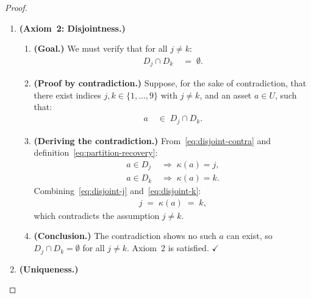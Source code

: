 \documentclass[12pt,openany]{book}
\newcommand{\calU}{\mathcal{U}}
\newcommand{\calD}{\mathcal{D}}
\numberwithin{equation}{chapter}
\theoremstyle{plain}
\theoremstyle{definition}
\theoremstyle{remark}
\def\calU{U}%
\def\calD{D}%
\def\mathcal#1{#1}%
\begin{document}
\begin{proof}
\begin{enumerate}
  \item \textbf{(Axiom~2: Disjointness.)}

  \begin{enumerate}

    \item \textbf{(Goal.)}
          We must verify that for all $j \neq k$:
          \begin{align}
            \calD_j \cap \calD_k &\;=\; \emptyset.
            \label{eq:disjoint-goal}
          \end{align}

    \item \textbf{(Proof by contradiction.)}
          Suppose, for the sake of contradiction, that there exist
          indices $j,k \in \{1,\ldots,9\}$ with $j \neq k$, and
          an asset $a \in \calU$, such that:
          \begin{align}
            a &\;\in\; \calD_j \cap \calD_k.
            \label{eq:disjoint-contra}
          \end{align}

    \item \textbf{(Deriving the contradiction.)}
          From~\eqref{eq:disjoint-contra} and
          definition~\eqref{eq:partition-recovery}:
          \begin{align}
            a \in \calD_j &\;\Longrightarrow\; \kappa(a) = j,
            \label{eq:disjoint-j}\\
            a \in \calD_k &\;\Longrightarrow\; \kappa(a) = k.
            \label{eq:disjoint-k}
          \end{align}
          Combining~\eqref{eq:disjoint-j} and~\eqref{eq:disjoint-k}:
          \begin{align}
            j \;=\; \kappa(a) \;=\; k,
          \end{align}
          which contradicts the assumption $j \neq k$.

    \item \textbf{(Conclusion.)}
          The contradiction shows no such $a$ can exist, so
          $\calD_j \cap \calD_k = \emptyset$ for all $j \neq k$.
          Axiom~2 is satisfied. \hfill$\checkmark$

  \end{enumerate}


  \item \textbf{(Uniqueness.)}
  \begin{enumerate}


\end{enumerate}
\end{enumerate}
\end{proof}
\end{document}
